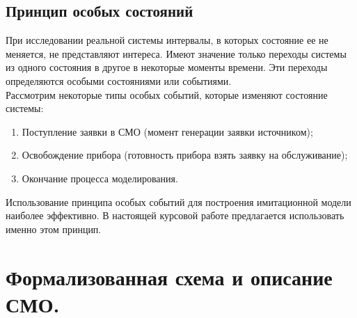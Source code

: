 \documentclass{article}
\begin{document}
	
	\subsection{Принцип особых состояний}
	При исследовании реальной системы интервалы, в которых состояние ее не меняется, не представляют интереса. Имеют значение только переходы системы из одного состояния в другое в некоторые моменты времени. Эти переходы определяются особыми состояниями или событиями.\\
	Рассмотрим некоторые типы особых событий, которые изменяют состояние системы:
	\begin{enumerate}
		\item Поступление заявки в СМО (момент генерации заявки источником);
		\item Освобождение прибора (готовность прибора взять заявку на обслуживание);
		\item Окончание процесса моделирования.
	\end{enumerate}
	Использование принципа особых событий для построения имитационной модели наиболее эффективно. В настоящей курсовой работе предлагается использовать именно этом принцип.
	
	\newpage
	\section{Формализованная схема и описание СМО.}
	
\end{document}
